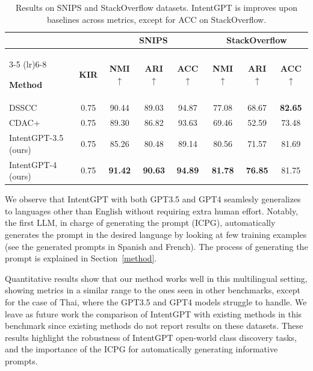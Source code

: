 \documentclass[11pt]{article}
\begin{document}
\begin{table}[t]
    \centering
    \begin{tabular}{@{}lccccccc@{}} %
        \toprule
        & & \multicolumn{3}{c}{\textbf{SNIPS}} & \multicolumn{3}{c}{\textbf{StackOverflow}} \\
        \cmidrule(lr){3-5} \cmidrule(lr){6-8}

        \textbf{Method} & \textbf{KIR} & \textbf{NMI} $\uparrow$ & \textbf{ARI}$\uparrow$ & \textbf{ACC}$\uparrow$& \textbf{NMI} $\uparrow$ & \textbf{ARI}$\uparrow$ & \textbf{ACC}$\uparrow$ \\
        \midrule

           DSSCC & 0.75 & 90.44 & 89.03 & 94.87 & 77.08 & 68.67 & \textbf{82.65} \\

            CDAC+ & 0.75 & 89.30 & 86.82 & 93.63 & 69.46 & 52.59 & 73.48\\
       \midrule                           
            IntentGPT-3.5 (ours) & 0.75 & 85.26 & 80.48 & 89.14 & 80.56 & 71.57 & 81.69\\
                                           
            IntentGPT-4 (ours) & 0.75 & \textbf{91.42} & \textbf{90.63} & \textbf{94.89} & \textbf{81.78} & \textbf{76.85} & 81.75 \\
                                            
        \bottomrule
    \end{tabular}
    
\caption{Results on SNIPS and StackOverflow datasets. IntentGPT is improves upon baselines across metrics, except for ACC on StackOverflow.}
\vspace{-2mm}
\label{tab:SNIPS-StackOverflow}
\end{table}

We observe that IntentGPT with both GPT3.5 and GPT4 seamlesly generalizes to languages other than English without requiring extra human effort. Notably, the first LLM, in charge of generating the prompt (ICPG), automatically generates the prompt in the desired language by looking at few training examples (see the generated prompts in Spanish and French). The process of generating the prompt is explained in Section~\ref{method}.

Quantitative results show that our method works well in this multilingual setting, showing metrics in a similar range to the ones seen in other benchmarks, except for the case of Thai, where the GPT3.5 and GPT4 models struggle to handle. We leave as future work the comparison of IntentGPT with existing methods in this benchmark since existing methods do not report results on these datasets. These results highlight the robustness of IntentGPT open-world class discovery tasks, and the importance of the ICPG for automatically generating informative prompts. 
\end{document}
